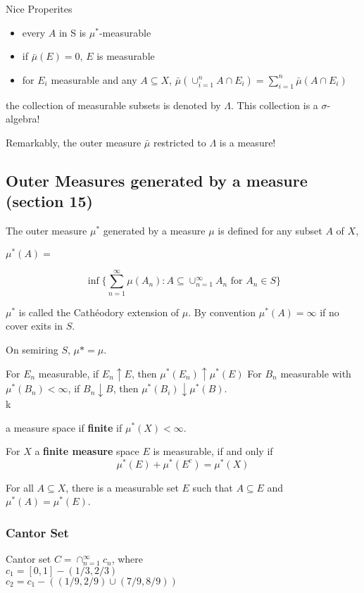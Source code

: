 \documentclass[a4paper, 12pt]{article}
\newcommand{\bt}[1]{\textbf{#1}} %
\begin{document}
\begin{multicols}{2}
Nice Properites
\begin{itemize}
    \item every $A$ in S is $\mu^*$-measurable
    \item if $\bar \mu(E) = 0$, $E$ is measurable
    \item for $E_i$ measurable and any $A \subseteq X$, 
    $\bar \mu(\cup_{i=1}^n A \cap E_i) = \sum_{i=1}^n \bar \mu(A \cap E_i)$
\end{itemize}

the collection of measurable subsets is denoted by $\Lambda$.
This collection is a $\sigma$-algebra! 

Remarkably, the outer measure $\bar \mu$ restricted to $\Lambda$ is a measure!


\subsection{Outer Measures generated by a measure (section 15)}
The outer measure $\mu^*$ generated by a measure $\mu$ is defined for any subset $A$ of $X$, 
\centerline{$\mu^*(A) =$}
$$\inf\{\sum_{n=1}^\infty \mu(A_n) : A \subseteq \cup_{n=1}^\infty A_n 
\text{ for $A_n \in S$}\}$$

$\mu^*$ is called the Cath\'eodory extension of $\mu$.
By convention $\mu^*(A) = \infty$ if no cover exits in $S$.

On semiring $S$, $\mu* = \mu$.


For $E_n$ measurable, if $E_n \uparrow E$, then $\mu^*(E_n) \uparrow \mu^*(E)$
For $B_n$ measurable with $\mu^*(B_n) < \infty$, if $B_n \downarrow B$, then
$\mu^*(B_i) \downarrow \mu^*(B)$. \\k

a measure space if \bt{finite} if $\mu^*(X) < \infty$.


For $X$ a \bt{finite measure} space $E$ is measurable, if and only if 
$$\mu^*(E) + \mu^*(E^c) = \mu^*(X)$$

For all $A \subseteq X$, there is a measurable set $E$ such that 
$A \subseteq E$ and $\mu^*(A) = \mu^*(E)$.


\subsubsection{Cantor Set}
Cantor set $C = \cap_{n=1}^\infty c_n$, where \\
$c_1 = [0, 1] - (1/3, 2/3) $\\
$c_2 = c_1 - ((1/9, 2/9) \cup (7/9, 8/9))$ \\


\end{multicols}
\end{document}
